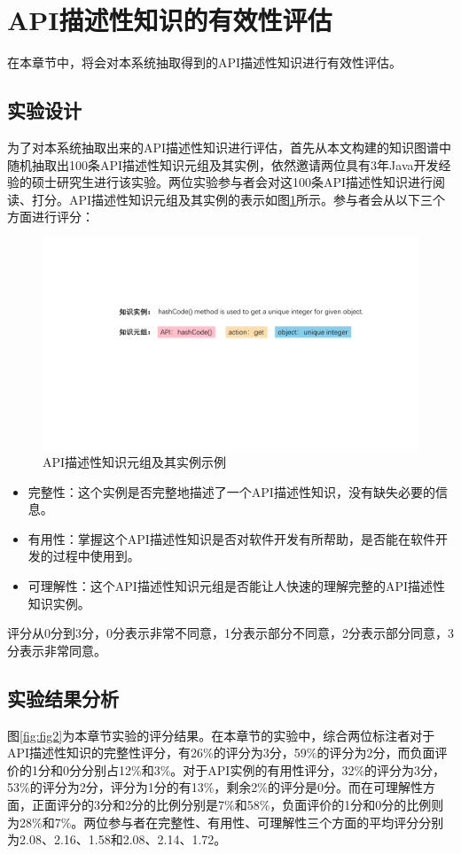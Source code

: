 \section{API描述性知识的有效性评估}
在本章节中，将会对本系统抽取得到的API描述性知识进行有效性评估。

\subsection{实验设计}
为了对本系统抽取出来的API描述性知识进行评估，首先从本文构建的知识图谱中随机抽取出100条API描述性知识元组及其实例，依然邀请两位具有3年Java开发经验的硕士研究生进行该实验。两位实验参与者会对这100条API描述性知识进行阅读、打分。API描述性知识元组及其实例的表示如图\ref{fig:fig1}所示。参与者会从以下三个方面进行评分：

\begin{figure}[htb]
    \centering
    \includegraphics[width=\textwidth]{image/instance.pdf}
    \caption{API描述性知识元组及其实例示例} 
    \label{fig:fig1} 
\end{figure}

\begin{itemize}
    \item 完整性：这个实例是否完整地描述了一个API描述性知识，没有缺失必要的信息。
    \item 有用性：掌握这个API描述性知识是否对软件开发有所帮助，是否能在软件开发的过程中使用到。
    \item 可理解性：这个API描述性知识元组是否能让人快速的理解完整的API描述性知识实例。
\end{itemize}
评分从0分到3分，0分表示非常不同意，1分表示部分不同意，2分表示部分同意，3分表示非常同意。

\subsection{实验结果分析}
图\ref{fig:fig2}为本章节实验的评分结果。在本章节的实验中，综合两位标注者对于API描述性知识的完整性评分，有26\%的评分为3分，59\%的评分为2分，而负面评价的1分和0分分别占12\%和3\%。对于API实例的有用性评分，32\%的评分为3分，53\%的评分为2分，评分为1分的有13\%，剩余2\%的评分是0分。而在可理解性方面，正面评分的3分和2分的比例分别是7\%和58\%，负面评价的1分和0分的比例则为28\%和7\%。两位参与者在完整性、有用性、可理解性三个方面的平均评分分别为2.08、2.16、1.58和2.08、2.14、1.72。	


